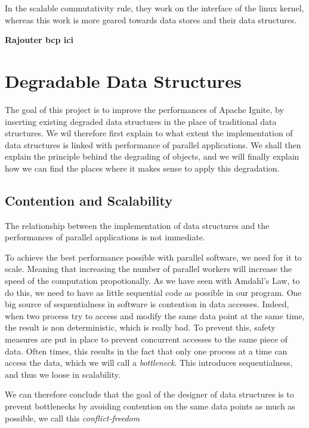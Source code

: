 \documentclass[conference]{IEEEtran}
\begin{document}
In the scalable commutativity rule, they work on the interface of the linux kernel, whereas this work is more geared towards data stores and their data structures.

\textbf{Rajouter bcp ici}


\section{Degradable Data Structures}
The goal of this project is to improve the performances of Apache Ignite, by inserting existing degraded data structures in the place of traditional data structures. We wil therefore first explain to what extent the implementation of data structures is linked with performance of parallel applications. We shall then explain the principle behind the degrading of objects, and we will finally explain how we can find the places where it makes sense to apply this degradation.

\subsection{Contention and Scalability} 
The relationship between the implementation of data structures and the performances of parallel applications is not immediate.

To achieve the best performance possible with parallel software, we need for it to scale. Meaning that increasing the number of parallel workers will increase the speed of the computation propotionally. As we have seen with Amdahl's Law, to do this, we need to have as little sequential code as possible in our program. One big source of sequentialness in software is contention in data accesses. Indeed, when two process try to access and modify the same data point at the same time, the result is non deterministic, which is really bad. To prevent this, safety measures are put in place to prevent concurrent accesses to the same piece of data. Often times, this results in the fact that only one process at a time can access the data, which we will call a \textit{bottleneck}. This introduces sequentialness, and thus we loose in scalability.

We can therefore conclude that the goal of the designer of data structures is to prevent bottlenecks by avoiding contention on the same data points as much as possible, we call this \textit{conflict-freedom}
\end{document}
